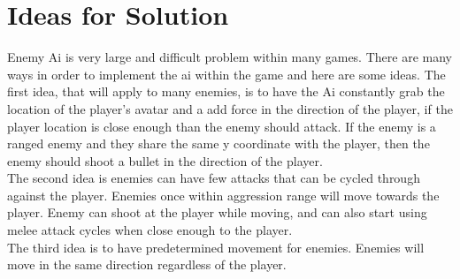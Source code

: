 \documentclass{article}
\begin{document}
\section{Ideas for Solution}
 Enemy Ai is very large and difficult problem within many games. There are many ways in order to implement the ai within the game and here are some ideas. The first idea, that will apply to many enemies,  is to have  the Ai constantly grab the location of the player’s avatar and a add force in the direction of the player, if the player location is close enough than the enemy should attack. If the enemy is a ranged enemy and  they share the same y coordinate with the player, then the enemy should shoot a bullet in the direction of the player. \\
 The second idea is enemies can have few attacks that can be cycled through against the player. Enemies once within aggression range will move towards the player. Enemy can shoot at the player while moving, and can also start using melee attack cycles when close enough to the player.\\
 The third idea is to have predetermined movement for enemies. Enemies will move in the same direction regardless of the player. \\
\end{document}
